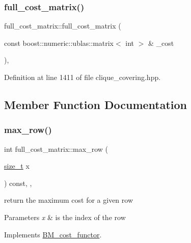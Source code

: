 \subsubsection{\texorpdfstring{full\+\_\+cost\+\_\+matrix()}{full\_cost\_matrix()}}
{\footnotesize\ttfamily full\+\_\+cost\+\_\+matrix\+::full\+\_\+cost\+\_\+matrix (\begin{DoxyParamCaption}\item[{const boost\+::numeric\+::ublas\+::matrix$<$ int $>$ \&}]{\+\_\+cost }\end{DoxyParamCaption})\hspace{0.3cm}{\ttfamily [inline]}, {\ttfamily [explicit]}}



Definition at line 1411 of file clique\+\_\+covering.\+hpp.



\subsection{Member Function Documentation}
\mbox{\label{structfull__cost__matrix_a742972fc40fef6f6a007f211e18d5034}} 
\subsubsection{\texorpdfstring{max\+\_\+row()}{max\_row()}}
{\footnotesize\ttfamily int full\+\_\+cost\+\_\+matrix\+::max\+\_\+row (\begin{DoxyParamCaption}\item[{\hyperlink{tutorial__fpt__2017_2intro_2sixth_2test_8c_a7c94ea6f8948649f8d181ae55911eeaf}{size\+\_\+t}}]{x }\end{DoxyParamCaption}) const\hspace{0.3cm}{\ttfamily [inline]}, {\ttfamily [override]}, {\ttfamily [virtual]}}



return the maximum cost for a given row 


\begin{DoxyParams}{Parameters}
{\em x} & is the index of the row \\
\hline
\end{DoxyParams}


Implements \hyperlink{structBM__cost__functor_a40632938a246de559ee24def934ed08d}{B\+M\+\_\+cost\+\_\+functor}.



